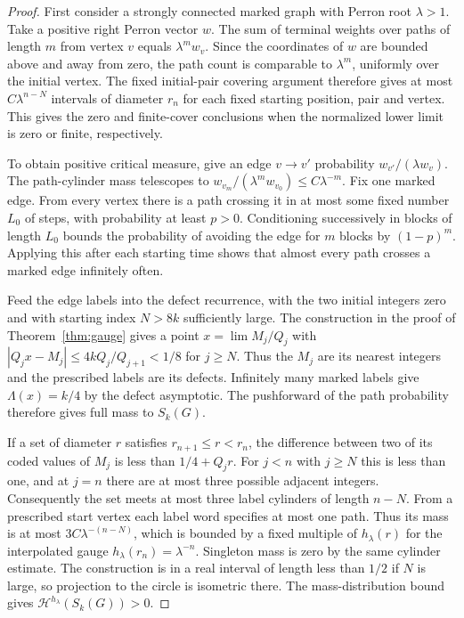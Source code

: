 \documentclass[11pt]{article}
\theoremstyle{definition}
\theoremstyle{remark}
\newcommand{\Lam}{\Lambda}
\begin{document}
\begin{proof}
First consider a strongly connected marked graph with Perron root
$\lambda>1$. Take a positive right Perron vector $w$. The sum of
terminal weights over paths of length $m$ from vertex $v$ equals
$\lambda^m w_v$. Since the coordinates of $w$ are bounded above and
away from zero, the path count is comparable to $\lambda^m$, uniformly
over the initial vertex. The fixed initial-pair covering argument
therefore gives at most $C\lambda^{n-N}$ intervals of diameter $r_n$
for each fixed starting position, pair and vertex. This gives the
zero and finite-cover conclusions when the normalized lower limit is
zero or finite, respectively.

To obtain positive critical measure, give an edge $v\to v'$ probability
$w_{v'}/(\lambda w_v)$. The path-cylinder mass telescopes to
$w_{v_m}/(\lambda^m w_{v_0})\le C\lambda^{-m}$. Fix one marked edge.
From every vertex there is a path crossing it in at most some fixed
number $L_0$ of steps, with probability at least $p>0$. Conditioning
successively in blocks of length $L_0$ bounds the probability of
avoiding the edge for $m$ blocks by $(1-p)^m$. Applying this after each
starting time shows that almost every path crosses a marked edge
infinitely often.

Feed the edge labels into the defect recurrence, with the two
initial integers zero and with starting index $N>8k$ sufficiently
large. The construction in the proof of Theorem~\ref{thm:gauge} gives
a point $x=\lim M_j/Q_j$ with
$|Q_jx-M_j|\le 4kQ_j/Q_{j+1}<1/8$ for $j\ge N$.
Thus the $M_j$ are its nearest integers and the prescribed labels
are its defects. Infinitely many marked labels give $\Lam(x)=k/4$
by the defect asymptotic. The pushforward of the path probability
therefore gives full mass to $S_k(G)$.

If a set of diameter $r$ satisfies $r_{n+1}\le r<r_n$, the difference
between two of its coded values of $M_j$ is less than
$1/4+Q_jr$. For $j<n$ with $j\ge N$ this is less than one, and
at $j=n$ there are at most three possible adjacent integers.
Consequently the set meets at most three label cylinders of length
$n-N$. From a prescribed start vertex each label word specifies at
most one path. Thus its mass is at most $3C\lambda^{-(n-N)}$, which is
bounded by a fixed multiple of $h_\lambda(r)$ for the interpolated gauge
$h_\lambda(r_n)=\lambda^{-n}$. Singleton mass is zero by the same
cylinder estimate. The construction is in a real interval of length
less than $1/2$ if $N$ is large, so projection to the circle is
isometric there. The mass-distribution bound gives
$\mathcal H^{h_\lambda}(S_k(G))>0$.


\end{proof}
\end{document}
